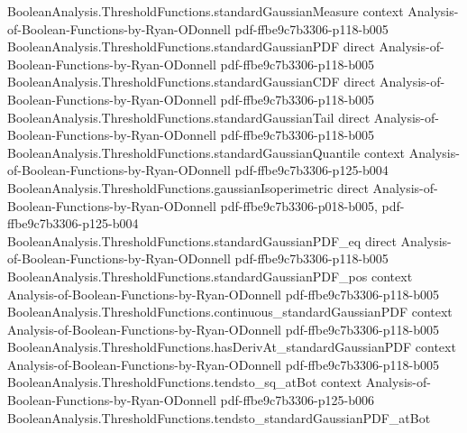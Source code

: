 \begin{theorem}
\leanok
{}
\proofstep
  {BooleanAnalysis.ThresholdFunctions.standardGaussianMeasure}
  {context}
  {Analysis-of-Boolean-Functions-by-Ryan-ODonnell}
  {pdf-ffbe9c7b3306-p118-b005}
\proofstep
  {BooleanAnalysis.ThresholdFunctions.standardGaussianPDF}
  {direct}
  {Analysis-of-Boolean-Functions-by-Ryan-ODonnell}
  {pdf-ffbe9c7b3306-p118-b005}
\proofstep
  {BooleanAnalysis.ThresholdFunctions.standardGaussianCDF}
  {direct}
  {Analysis-of-Boolean-Functions-by-Ryan-ODonnell}
  {pdf-ffbe9c7b3306-p118-b005}
\proofstep
  {BooleanAnalysis.ThresholdFunctions.standardGaussianTail}
  {direct}
  {Analysis-of-Boolean-Functions-by-Ryan-ODonnell}
  {pdf-ffbe9c7b3306-p118-b005}
\proofstep
  {BooleanAnalysis.ThresholdFunctions.standardGaussianQuantile}
  {context}
  {Analysis-of-Boolean-Functions-by-Ryan-ODonnell}
  {pdf-ffbe9c7b3306-p125-b004}
\proofstep
  {BooleanAnalysis.ThresholdFunctions.gaussianIsoperimetric}
  {direct}
  {Analysis-of-Boolean-Functions-by-Ryan-ODonnell}
  {pdf-ffbe9c7b3306-p018-b005,
    pdf-ffbe9c7b3306-p125-b004}
\proofstep
  {BooleanAnalysis.ThresholdFunctions.standardGaussianPDF_eq}
  {direct}
  {Analysis-of-Boolean-Functions-by-Ryan-ODonnell}
  {pdf-ffbe9c7b3306-p118-b005}
\proofstep
  {BooleanAnalysis.ThresholdFunctions.standardGaussianPDF_pos}
  {context}
  {Analysis-of-Boolean-Functions-by-Ryan-ODonnell}
  {pdf-ffbe9c7b3306-p118-b005}
\proofstep
  {BooleanAnalysis.ThresholdFunctions.continuous_standardGaussianPDF}
  {context}
  {Analysis-of-Boolean-Functions-by-Ryan-ODonnell}
  {pdf-ffbe9c7b3306-p118-b005}
\proofstep
  {BooleanAnalysis.ThresholdFunctions.hasDerivAt_standardGaussianPDF}
  {context}
  {Analysis-of-Boolean-Functions-by-Ryan-ODonnell}
  {pdf-ffbe9c7b3306-p118-b005}
\proofstep
  {BooleanAnalysis.ThresholdFunctions.tendsto_sq_atBot}
  {context}
  {Analysis-of-Boolean-Functions-by-Ryan-ODonnell}
  {pdf-ffbe9c7b3306-p125-b006}
\proofstep
  {BooleanAnalysis.ThresholdFunctions.tendsto_standardGaussianPDF_atBot}

\end{theorem}
